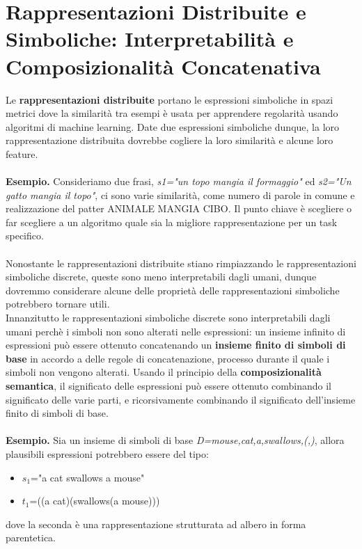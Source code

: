 \section{Rappresentazioni Distribuite e Simboliche: Interpretabilità e Composizionalità Concatenativa}
Le \textbf{rappresentazioni distribuite} portano le espressioni simboliche in spazi metrici dove la similarità tra esempi è usata per apprendere regolarità usando algoritmi di machine learning. Date due espressioni simboliche dunque, la loro rappresentazione distribuita dovrebbe cogliere la loro similarità e alcune loro feature. \\\\\textbf{Esempio.} Consideriamo due frasi, \textit{s1="un topo mangia il formaggio"} ed \textit{s2="Un gatto mangia il topo"}, ci sono varie similarità, come numero di parole in comune e realizzazione del patter ANIMALE MANGIA CIBO. Il punto chiave è scegliere o far scegliere a un algoritmo quale sia la migliore rappresentazione per un task specifico.\\\\
Nonostante le rappresentazioni distribuite stiano rimpiazzando le rappresentazioni simboliche discrete, queste sono meno interpretabili dagli umani, dunque dovremmo considerare alcune delle proprietà delle rappresentazioni simboliche potrebbero tornare utili.\\
Innanzitutto le rappresentazioni simboliche discrete sono interpretabili dagli umani perchè i simboli non sono alterati nelle espressioni: un insieme infinito di espressioni può essere ottenuto concatenando un \textbf{insieme finito di simboli di base} in accordo a delle regole di concatenazione, processo durante il quale i simboli non vengono alterati. Usando il principio della \textbf{composizionalità semantica}, il significato delle espressioni può essere ottenuto combinando il significato delle varie parti, e ricorsivamente combinando il significato dell'insieme finito di simboli di base. 
\\\\
\textbf{Esempio.} Sia un insieme di simboli di base \textit{D={mouse,cat,a,swallows,(,)}}, allora plausibili espressioni potrebbero essere del tipo:
\begin{itemize}
    \item $s_1$="a cat swallows a mouse"
    \item $t_1$=((a cat)(swallows(a mouse)))
\end{itemize}dove la seconda è una rappresentazione strutturata ad albero in forma parentetica.\\\\

